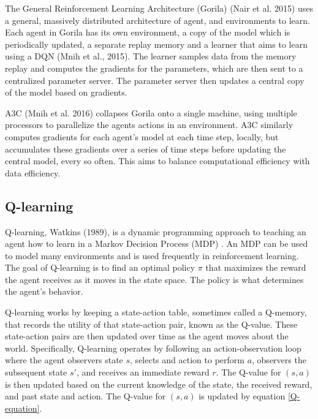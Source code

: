 \documentclass[jair,twoside,11pt,theapa]{article}
\begin{document}
The General Reinforcement Learning Architecture (Gorila) (Nair et al. 2015)\nocite{Gorila} uses a general, massively distributed architecture of agent, and environments to learn. Each agent in Gorila has its own environment, a copy of the model which is periodically updated, a separate replay memory and a learner that aims to learn using a DQN (Mnih et al., 2015)\nocite{Mnih2015}. The learner samples data from the memory replay and computes the gradients for the parameters, which are then sent to a centralized parameter server. The parameter server then updates a central copy of the model based on gradients. 

A3C (Mnih et al. 2016)\nocite{A3C} collapses Gorila onto a single machine, using multiple processors to parallelize the agents actions in an environment. A3C similarly computes gradients for each agent's model at each time step, locally, but accumulates these gradients over a series of time steps before updating the central model, every so often. This aims to balance computational efficiency with data efficiency. 

\subsection{Q-learning}
\label{Q-learning}
Q-learning, Watkins (1989)\nocite{watkins}, is a dynamic programming approach to teaching an agent how to learn in a Markov Decision Process (MDP) \cite{Bellman}. An MDP can be used to model many environments and is used frequently in reinforcement learning. The goal of Q-learning is to find an optimal policy $\pi$ that maximizes the reward the agent receives as it moves in the state space. The policy is what determines the agent's behavior. 

Q-learning works by keeping a state-action table, sometimes called a Q-memory, that records the utility of that state-action pair, known as the Q-value. These state-action pairs are then updated over time as the agent moves about the world. Specifically, Q-learning operates by following an action-observation loop where the agent observers state $s$, selects and action to perform $a$, observers the subsequent state $s'$, and receives an immediate reward $r$. The Q-value for $(s,a)$ is then updated based on the current knowledge of the state, the received reward, and past state and action. The Q-value for $(s,a)$ is updated by equation \ref{Q-equation}.
\end{document}
